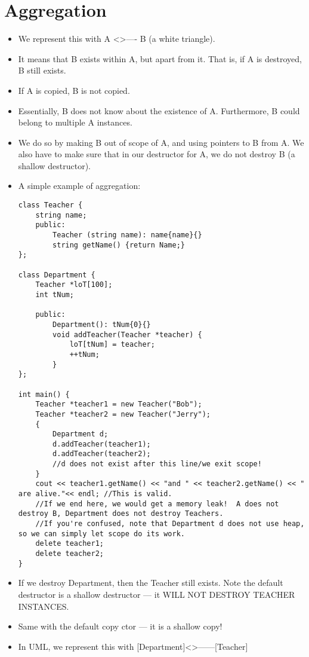 \documentclass{article}
\begin{document}
\section{Aggregation}
\begin{itemize}
\item We represent this with A <>---- B (a white triangle).
\item It means that B exists within A, but apart from it.  That is, if A is destroyed, B still exists.  
\item If A is copied, B is not copied.
\item Essentially, B does not know about the existence of A.  Furthermore, B could belong to multiple A instances.
\item We do so by making B out of scope of A, and using pointers to B from A.  We also have to make sure that in our destructor for A, we do not destroy B (a shallow destructor).
\item A simple example of aggregation:
\begin{lstlisting}
class Teacher {
    string name;
    public:
        Teacher (string name): name{name}{}
        string getName() {return Name;}
};

class Department {
    Teacher *loT[100];
    int tNum;

    public: 
        Department(): tNum{0}{}
        void addTeacher(Teacher *teacher) {
            loT[tNum] = teacher;
            ++tNum;
        }
};

int main() {
    Teacher *teacher1 = new Teacher("Bob");
    Teacher *teacher2 = new Teacher("Jerry");
    {
        Department d;
        d.addTeacher(teacher1);
        d.addTeacher(teacher2);
        //d does not exist after this line/we exit scope!
    }
    cout << teacher1.getName() << "and " << teacher2.getName() << " are alive."<< endl; //This is valid.
    //If we end here, we would get a memory leak!  A does not destroy B, Department does not destroy Teachers.
    //If you're confused, note that Department d does not use heap, so we can simply let scope do its work.
    delete teacher1;
    delete teacher2;
}
\end{lstlisting}
\item If we destroy Department, then the Teacher still exists.  Note the default destructor is a shallow destructor --- it WILL NOT DESTROY TEACHER INSTANCES.
\item Same with the default copy ctor --- it is a shallow copy!
\item In UML, we represent this with [Department]<>------[Teacher]
\end{itemize}
\end{document}
